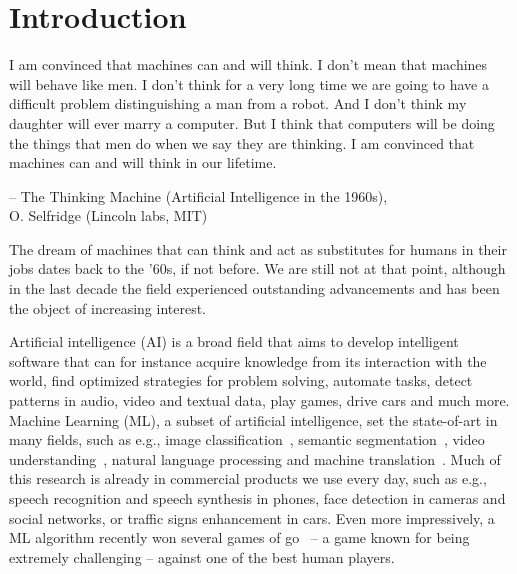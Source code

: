 \chapter{Introduction}


{
    \setlength\epigraphwidth{10cm}
    \setlength\epigraphrule{0pt}
    \renewcommand{\epigraphflush}{center}
    \epigraph{
        I am convinced that machines can and will think. I don't mean that
        machines will behave like men. I don't think for a very long time we
        are going to have a difficult problem distinguishing a man from a
        robot. And I don't think my daughter will ever marry a computer. But I
        think that computers will be doing the things that men do when we say
        they are thinking. I am convinced that machines can and will think in
        our lifetime.}{-- \textup{The Thinking Machine (Artificial Intelligence
            in the 1960s)}, \\ O. Selfridge (Lincoln labs, MIT)}
}

The dream of machines that can think and act as substitutes for humans in their
jobs dates back to the '60s, if not before. We are still not at that point,
although in the last decade the field experienced outstanding advancements and
has been the object of increasing interest.

Artificial intelligence (AI) is a broad field that aims to develop intelligent
software that can for instance acquire knowledge from its interaction with the
world, find optimized strategies for problem solving, automate tasks, detect
patterns in audio, video and textual data, play games, drive cars and much
more. Machine Learning (ML), a subset of artificial intelligence, set the
state-of-art in many fields, such as e.g., image classification~\cite{
Krizhevsky-2012,szegedy2016inception,visin2015renet}, semantic
segmentation~\cite{chen2015semantic, Visin_2016_CVPR_Workshops}, video
understanding~\citep{srivastava2015unsupervised, Xu-et-al-arxiv2015}, natural
language processing and machine translation~\citep{Bahdanau-et-al-arxiv2014}.
Much of this research is already in commercial products we use every day, such
as e.g., speech recognition and speech synthesis in phones, face detection in
cameras and social networks, or traffic signs enhancement in cars. Even more
impressively, a ML algorithm recently won several games of go~\citep{
silver2016alphago} -- a game known for being extremely challenging -- against
one of the best human players.

